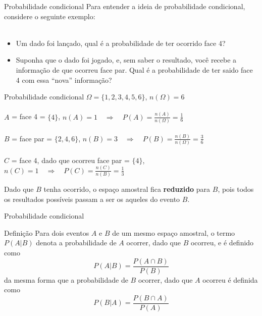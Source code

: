 \documentclass[10pt]{beamer}\usepackage[]{graphicx}\usepackage[]{color}
\theoremstyle{definition}
\begin{document}
\begin{frame}{Probabilidade condicional}
 Para entender a ideia de probabilidade condicional, considere o
 seguinte exemplo: \\~\\
 \begin{itemize}
 \item Um dado foi lançado, qual é a probabilidade de ter ocorrido face
   4?
 \item Suponha que o dado foi jogado, e, sem saber o resultado, você
   recebe a informação de que ocorreu face par. Qual é a probabilidade
   de ter saido face 4 com essa ``nova'' informação?
 \end{itemize}
\end{frame}

\begin{frame}{Probabilidade condicional}
$\Omega = \{1,2,3,4,5,6\}$, $n(\Omega) = 6$ \\~\\
$A$ = face 4 = $\{4\}$, $n(A) = 1 \quad \Rightarrow \quad P(A) =
    \frac{n(A)}{n(\Omega)} = \frac{1}{6}$ \\~\\
$B$ = face par = $\{2,4,6\}$, $n(B) = 3 \quad \Rightarrow \quad
P(B) = \frac{n(B)}{n(\Omega)} = \frac{3}{6}$ \\~\\
$C$ = face 4, dado que ocorreu face par = $\{4\}$, $n(C) = 1
\quad \Rightarrow \quad P(C) = \frac{n(C)}{n(B)} = \frac{1}{3}$
\begin{alertblock}{}
  Dado que $B$ tenha ocorrido, o espaço amostral fica \textbf{reduzido}
  para $B$, pois todos os resultados possíveis passam a ser os aqueles
  do evento $B$.
\end{alertblock}
\end{frame}

\begin{frame}{Probabilidade condicional}
  \begin{block}{Definição}
    Para dois eventos $A$ e $B$ de um mesmo espaço amostral, o
    termo $P(A|B)$ denota a probabilidade de $A$ ocorrer, dado que $B$
    ocorreu, e é definido como
    \begin{equation*}
      P(A|B) = \frac{P(A \cap B)}{P(B)}
    \end{equation*}
    da mesma forma que a probabilidade de $B$ ocorrer, dado que $A$
    ocorreu é definida como
    \begin{equation*}
      P(B|A) = \frac{P(B \cap A)}{P(A)}
    \end{equation*}
  \end{block}
\end{frame}
\end{document}
